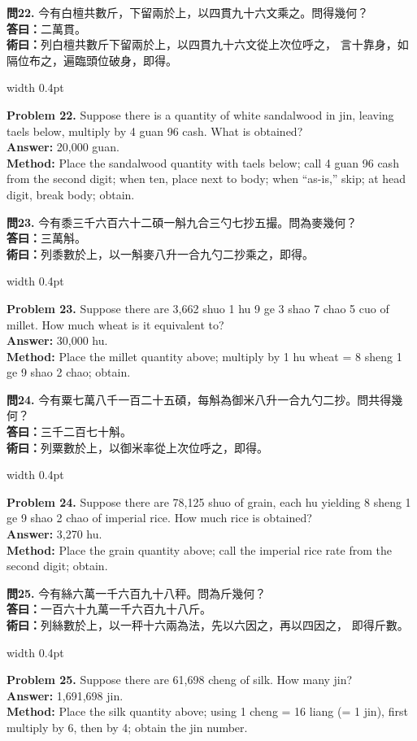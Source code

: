 \documentclass[10pt,a4paper]{article}
\newlength{\cnwidth}
\newlength{\enwidth}
\newcommand{\bilingual}[2]{%
  \noindent%
  \begin{minipage}[t]{\cnwidth}%
    #1%
  \end{minipage}%
  \hfill\vrule width 0.4pt\hfill%
  \begin{minipage}[t]{\enwidth}%
    #2%
  \end{minipage}%
  \par\smallskip%
}
\begin{document}
\bilingual{%
  \textbf{問22.}
  今有白檀共數斤，下留兩於上，以四貫九十六文乘之。問得幾何？\\
  \textbf{答曰：}二萬貫。\\
  \textbf{術曰：}列白檀共數斤下留兩於上，以四貫九十六文從上次位呼之，
  言十靠身，如隔位布之，遍臨頭位破身，即得。
}{%
  \textbf{Problem 22.}
  Suppose there is a quantity of white sandalwood in jin,
  leaving taels below, multiply by 4 guan 96 cash.
  What is obtained?\\
  \textbf{Answer:} 20,000 guan.\\
  \textbf{Method:} Place the sandalwood quantity with taels below;
  call 4 guan 96 cash from the second digit; when ten, place next to body;
  when ``as-is,'' skip; at head digit, break body; obtain.
}

\bilingual{%
  \textbf{問23.}
  今有黍三千六百六十二碩一斛九合三勺七抄五撮。問為麥幾何？\\
  \textbf{答曰：}三萬斛。\\
  \textbf{術曰：}列黍數於上，以一斛麥八升一合九勺二抄乘之，即得。
}{%
  \textbf{Problem 23.}
  Suppose there are 3,662 shuo 1 hu 9 ge 3 shao 7 chao 5 cuo of millet.
  How much wheat is it equivalent to?\\
  \textbf{Answer:} 30,000 hu.\\
  \textbf{Method:} Place the millet quantity above; multiply by 1 hu wheat
  = 8 sheng 1 ge 9 shao 2 chao; obtain.
}

\bilingual{%
  \textbf{問24.}
  今有粟七萬八千一百二十五碩，每斛為御米八升一合九勺二抄。問共得幾何？\\
  \textbf{答曰：}三千二百七十斛。\\
  \textbf{術曰：}列粟數於上，以御米率從上次位呼之，即得。
}{%
  \textbf{Problem 24.}
  Suppose there are 78,125 shuo of grain, each hu yielding 8 sheng 1 ge
  9 shao 2 chao of imperial rice. How much rice is obtained?\\
  \textbf{Answer:} 3,270 hu.\\
  \textbf{Method:} Place the grain quantity above; call the imperial rice rate
  from the second digit; obtain.
}

\bilingual{%
  \textbf{問25.}
  今有絲六萬一千六百九十八秤。問為斤幾何？\\
  \textbf{答曰：}一百六十九萬一千六百九十八斤。\\
  \textbf{術曰：}列絲數於上，以一秤十六兩為法，先以六因之，再以四因之，
  即得斤數。
}{%
  \textbf{Problem 25.}
  Suppose there are 61,698 cheng of silk. How many jin?\\
  \textbf{Answer:} 1,691,698 jin.\\
  \textbf{Method:} Place the silk quantity above; using 1 cheng = 16 liang
  (= 1 jin), first multiply by 6, then by 4; obtain the jin number.
}
\end{document}
